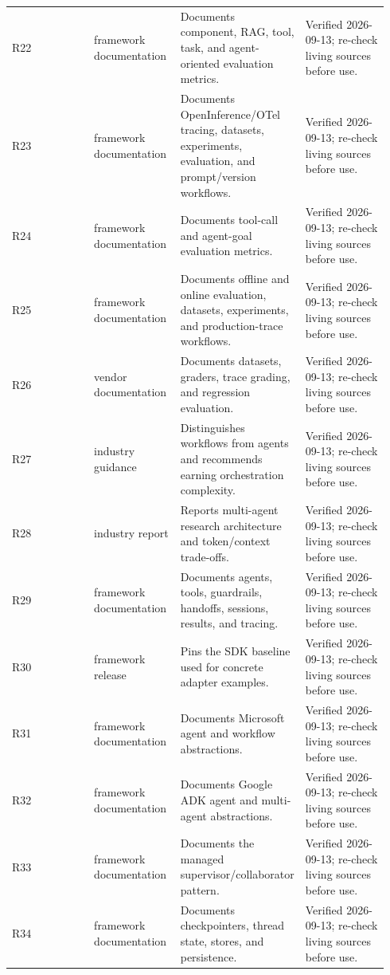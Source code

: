 \begin{longtable}{@{}Y{0.2350\linewidth}Y{0.2350\linewidth}Y{0.2350\linewidth}Y{0.2350\linewidth}@{}}
R22 & framework documentation & Documents component, RAG, tool, task, and agent-oriented evaluation metrics. & Verified 2026-09-13; re-check living sources before use. \\
R23 & framework documentation & Documents OpenInference/OTel tracing, datasets, experiments, evaluation, and prompt/version workflows. & Verified 2026-09-13; re-check living sources before use. \\
R24 & framework documentation & Documents tool-call and agent-goal evaluation metrics. & Verified 2026-09-13; re-check living sources before use. \\
R25 & framework documentation & Documents offline and online evaluation, datasets, experiments, and production-trace workflows. & Verified 2026-09-13; re-check living sources before use. \\
R26 & vendor documentation & Documents datasets, graders, trace grading, and regression evaluation. & Verified 2026-09-13; re-check living sources before use. \\
R27 & industry guidance & Distinguishes workflows from agents and recommends earning orchestration complexity. & Verified 2026-09-13; re-check living sources before use. \\
R28 & industry report & Reports multi-agent research architecture and token/context trade-offs. & Verified 2026-09-13; re-check living sources before use. \\
R29 & framework documentation & Documents agents, tools, guardrails, handoffs, sessions, results, and tracing. & Verified 2026-09-13; re-check living sources before use. \\
R30 & framework release & Pins the SDK baseline used for concrete adapter examples. & Verified 2026-09-13; re-check living sources before use. \\
R31 & framework documentation & Documents Microsoft agent and workflow abstractions. & Verified 2026-09-13; re-check living sources before use. \\
R32 & framework documentation & Documents Google ADK agent and multi-agent abstractions. & Verified 2026-09-13; re-check living sources before use. \\
R33 & framework documentation & Documents the managed supervisor/collaborator pattern. & Verified 2026-09-13; re-check living sources before use. \\
R34 & framework documentation & Documents checkpointers, thread state, stores, and persistence. & Verified 2026-09-13; re-check living sources before use. \\

\end{longtable}
